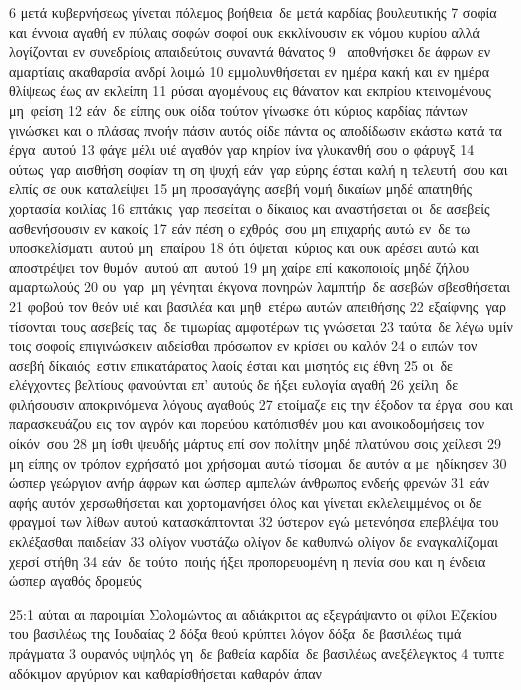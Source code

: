 \documentclass[10pt,oneside,footinclude=true,headinclude=true]{scrbook} %
\begin{document}
6 μετά κυβερνήσεως γίνεται πόλεμος βοήθεια δε μετά καρδίας βουλευτικής
7 σοφία και έννοια αγαθή εν πύλαις σοφών σοφοί ουκ εκκλίνουσιν εκ νόμου κυρίου αλλά λογίζονται εν συνεδρίοις απαιδεύτοις συναντά θάνατος
9  αποθνήσκει δε άφρων εν αμαρτίαις ακαθαρσία ανδρί λοιμώ
10 εμμολυνθήσεται εν ημέρα κακή και εν ημέρα θλίψεως έως αν εκλείπη
11 ρύσαι αγομένους εις θάνατον και εκπρίου κτεινομένους μη φείση
12 εάν δε είπης ουκ οίδα τούτον γίνωσκε ότι κύριος καρδίας πάντων γινώσκει και ο πλάσας πνοήν πάσιν αυτός οίδε πάντα ος αποδίδωσιν εκάστω κατά τα έργα αυτού
13 φάγε μέλι υιέ αγαθόν γαρ κηρίον ίνα γλυκανθή σου ο φάρυγξ
14 ούτως γαρ αισθήση σοφίαν τη ση ψυχή εάν γαρ εύρης έσται καλή η τελευτή σου και ελπίς σε ουκ καταλείψει
15 μη προσαγάγης ασεβή νομή δικαίων μηδέ απατηθής χορτασία κοιλίας
16 επτάκις γαρ πεσείται ο δίκαιος και αναστήσεται οι δε ασεβείς ασθενήσουσιν εν κακοίς
17 εάν πέση ο εχθρός σου μη επιχαρής αυτώ εν δε τω υποσκελίσματι αυτού μη επαίρου
18 ότι όψεται κύριος και ουκ αρέσει αυτώ και αποστρέψει τον θυμόν αυτού απ αυτού
19 μη χαίρε επί κακοποιοίς μηδέ ζήλου αμαρτωλούς
20 ου γαρ μη γένηται έκγονα πονηρών λαμπτήρ δε ασεβών σβεσθήσεται
21 φοβού τον θεόν υιέ και βασιλέα και μηθ ετέρω αυτών απειθήσης
22 εξαίφνης γαρ τίσονται τους ασεβείς τας δε τιμωρίας αμφοτέρων τις γνώσεται
23 ταύτα δε λέγω υμίν τοις σοφοίς επιγινώσκειν αιδείσθαι πρόσωπον εν κρίσει ου καλόν
24 ο ειπών τον ασεβή δίκαιός εστιν επικατάρατος λαοίς έσται και μισητός εις έθνη
25 οι δε ελέγχοντες βελτίους φανούνται επ' αυτούς δε ήξει ευλογία αγαθή
26 χείλη δε φιλήσουσιν αποκρινόμενα λόγους αγαθούς
27 ετοίμαζε εις την έξοδον τα έργα σου και παρασκευάζου εις τον αγρόν και πορεύου κατόπισθέν μου και ανοικοδομήσεις τον οίκόν σου
28 μη ίσθι ψευδής μάρτυς επί σον πολίτην μηδέ πλατύνου σοις χείλεσι
29 μη είπης ον τρόπον εχρήσατό μοι χρήσομαι αυτώ τίσομαι δε αυτόν α με ηδίκησεν
30 ώσπερ γεώργιον ανήρ άφρων και ώσπερ αμπελών άνθρωπος ενδεής φρενών
31 εάν αφής αυτόν χερσωθήσεται και χορτομανήσει όλος και γίνεται εκλελειμμένος οι δε φραγμοί των λίθων αυτού κατασκάπτονται
32 ύστερον εγώ μετενόησα επεβλέψα του εκλέξασθαι παιδείαν
33 ολίγον νυστάζω ολίγον δε καθυπνώ ολίγον δε εναγκαλίζομαι χερσί στήθη
34 εάν δε τούτο ποιής ήξει προπορευομένη η πενία σου και η ένδεια ώσπερ αγαθός δρομεύς
\par
25:1 αύται αι παροιμίαι Σολομώντος αι αδιάκριτοι ας εξεγράψαντο οι φίλοι Εζεκίου του βασιλέως της Ιουδαίας
2 δόξα θεού κρύπτει λόγον δόξα δε βασιλέως τιμά πράγματα
3 ουρανός υψηλός γη δε βαθεία καρδία δε βασιλέως ανεξέλεγκτος
4 τυπτε αδόκιμον αργύριον και καθαρίσθήσεται καθαρόν άπαν
\end{document}
